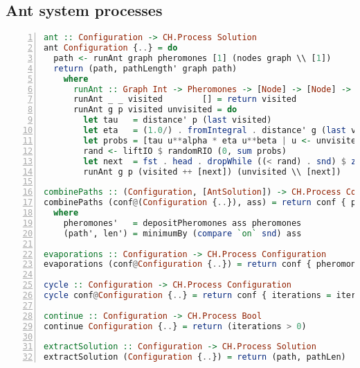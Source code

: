 \begin{landscape}
\section{Ant system processes}
\label{app:ant_system_processes}

\begin{lstlisting}[language=Haskell,frame=tb,numbers=left,caption=Implementation of basic processes for the ant system., basicstyle=\footnotesize\ttfamily]
ant :: Configuration -> CH.Process Solution
ant Configuration {..} = do
  path <- runAnt graph pheromones [1] (nodes graph \\ [1])
  return (path, pathLength' graph path)
    where
      runAnt :: Graph Int -> Pheromones -> [Node] -> [Node] -> CH.Process Path
      runAnt _ _ visited        [] = return visited
      runAnt g p visited unvisited = do
        let tau   = distance' p (last visited)
        let eta   = (1.0/) . fromIntegral . distance' g (last visited)
        let probs = [tau u**alpha * eta u**beta | u <- unvisited]
        rand <- liftIO $ randomRIO (0, sum probs)
        let next  = fst . head . dropWhile ((< rand) . snd) $ zip unvisited (scanl1 (+) probs)
        runAnt g p (visited ++ [next]) (unvisited \\ [next])

combinePaths :: (Configuration, [AntSolution]) -> CH.Process Configuration
combinePaths (conf@(Configuration {..}), ass) = return conf { pheromones = pheromones', path = path', pathLen = len' }
  where
    pheromones'   = depositPheromones ass pheromones
    (path', len') = minimumBy (compare `on` snd) ass

evaporations :: Configuration -> CH.Process Configuration
evaporations (conf@Configuration {..}) = return conf { pheromones = evaporation rho pheromones }

cycle :: Configuration -> CH.Process Configuration
cycle conf@Configuration {..} = return conf { iterations = iterations - 1 }

continue :: Configuration -> CH.Process Bool
continue Configuration {..} = return (iterations > 0)

extractSolution :: Configuration -> CH.Process Solution
extractSolution (Configuration {..}) = return (path, pathLen)
\end{lstlisting}

\end{landscape}